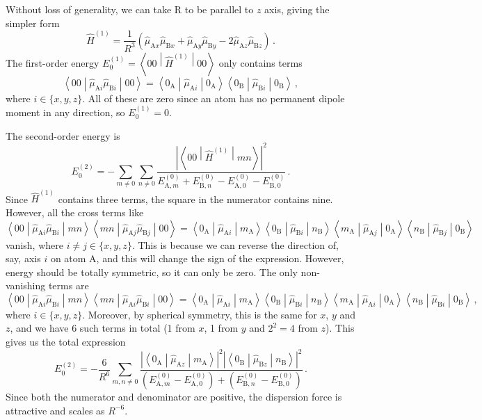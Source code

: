 \documentclass{article}
\theoremstyle{plain}\theoremheaderfont{\normalfont\itshape}\theorembodyfont{\rmfamily}\theoremseparator{.}\newtheorem*{rem}{Remark}\newtheorem*{ex}{Example}\newtheorem*{proof}{Proof}\newtheorem*{altp}{Alternative proof}
\theoremstyle{plain}\theoremheaderfont{\normalfont\bfseries}\theorembodyfont{\rmfamily}\theoremseparator{.}\newtheorem{thm}{Theorem}[section]\newtheorem{lem}[thm]{Lemma}\newtheorem{prop}[thm]{Proposition}\newtheorem*{cor}{Corollary}\newtheorem{defn}[thm]{Definition}\newtheorem{clm}[thm]{Claim}\newtheorem{clminproof}{Claim}
\theoremstyle{break}\theoremheaderfont{\normalfont\itshape}\theorembodyfont{\rmfamily}\theoremseparator{.\medskip}\newtheorem*{proofskip}{Proof}\newtheorem*{exs}{Examples}\newtheorem*{rems}{Remarks}
\theoremstyle{break}\theoremheaderfont{\normalfont\bfseries}\theorembodyfont{\rmfamily}\theoremseparator{.\medskip}\newtheorem{lemskip}[thm]{Lemma}\newtheorem{defnskip}[thm]{Definition}\newtheorem{propskip}[thm]{Proposition}\newtheorem{thmskip}[thm]{Theorem}
\numberwithin{equation}{section}
\newcommand{\mel}[3]{\left\langle #1 \middle| #2 \middle| #3 \right\rangle}
\newcommand{\expval}[2]{\left\langle #2 \middle| #1 \middle| #2 \right\rangle}
\newcommand{\vb}[1]{\bm{\mathrm{#1}}}
\newcommand{\abs}[1]{\left| #1 \right|}
\renewcommand{\AA}{\mathrm{A}}
\newcommand{\BB}{\mathrm{B}}
\begin{document}
    Without loss of generality, we can take \(\vb{R}\) to be parallel to \(z\) axis, giving the simpler form
    \begin{equation}
        \hat{H}^{(1)}=\frac{1}{R^3}(\hat{\mu}_{\AA x}\hat{\mu}_{\BB x}+\hat{\mu}_{\AA y}\hat{\mu}_{\BB y}-2\hat{\mu}_{\AA z}\hat{\mu}_{\BB z})\,.
    \end{equation}
    The first-order energy \(E_0^{(1)}=\expval{\hat{H}^{(1)}}{00}\) only contains terms
    \begin{equation}
        \expval{\hat{\mu}_{\AA i}\hat{\mu}_{\BB i}}{00}=\expval{\hat{\mu}_{\AA i}}{0_{\AA}}\expval{\hat{\mu}_{\BB i}}{0_{\BB}}\,,
    \end{equation}
    where \(i\in\{x,y,z\}\). All of these are zero since an atom has no permanent dipole moment in any direction, so \(E_0^{(1)}=0\).

    The second-order energy is
    \begin{equation}\label{dispersion_RS_sum}
        E_0^{(2)}=-\sum_{m\ne 0}\sum_{n\ne 0}\frac{\abs{\mel{00}{\hat{H}^{(1)}}{mn}}^2}{E_{\AA,m}^{(0)}+E_{\BB,n}^{(0)}-E_{\AA,0}^{(0)}-E_{\BB,0}^{(0)}}\,.
    \end{equation}
    Since \(\hat{H}^{(1)}\) contains three terms, the square in the numerator contains nine. However, all the cross terms like
    \begin{equation}
        \mel{00}{\hat{\mu}_{\AA i}\hat{\mu}_{\BB i}}{mn}\mel{mn}{\hat{\mu}_{\AA j}\hat{\mu}_{\BB j}}{00}=\mel{0_{\AA}}{\hat{\mu}_{\AA i}}{m_{\AA}}\mel{0_{\BB}}{\hat{\mu}_{\BB i}}{n_{\BB}}\mel{m_{\AA}}{\hat{\mu}_{\AA j}}{0_{\AA}}\mel{n_{\BB}}{\hat{\mu}_{\BB j}}{0_{\BB}}
    \end{equation}
    vanish, where \(i\ne j\in\{x,y,z\}\). This is because we can reverse the direction of, say, axis \(i\) on atom \(\AA\), and this will change the sign of the expression. However, energy should be totally symmetric, so it can only be zero. The only non-vanishing terms are
    \begin{equation}
        \mel{00}{\hat{\mu}_{\AA i}\hat{\mu}_{\BB i}}{mn}\mel{mn}{\hat{\mu}_{\AA i}\hat{\mu}_{\BB i}}{00}=\mel{0_{\AA}}{\hat{\mu}_{\AA i}}{m_{\AA}}\mel{0_{\BB}}{\hat{\mu}_{\BB i}}{n_{\BB}}\mel{m_{\AA}}{\hat{\mu}_{\AA i}}{0_{\AA}}\mel{n_{\BB}}{\hat{\mu}_{\BB i}}{0_{\BB}}\,,
    \end{equation}
    where \(i\in\{x,y,z\}\). Moreover, by spherical symmetry, this is the same for \(x\), \(y\) and \(z\), and we have 6 such terms in total (1 from \(x\), 1 from \(y\) and \(2^2=4\) from \(z\)). This gives us the total expression
    \begin{equation}\label{dispersion_force}
        E_0^{(2)}=-\frac{6}{R^6}\sum_{m,n\ne 0}\frac{\abs{\mel{0_{\AA}}{\hat{\mu}_{\AA z}}{m_{\AA}}}^2\abs{\mel{0_{\BB}}{\hat{\mu}_{\BB z}}{n_{\BB}}}^2}{(E_{\AA,m}^{(0)}-E_{\AA,0}^{(0)})+(E_{\BB,n}^{(0)}-E_{\BB,0}^{(0)})}\,.
    \end{equation}
    Since both the numerator and denominator are positive, the dispersion force is attractive and scales as \(R^{-6}\).
\end{document}
